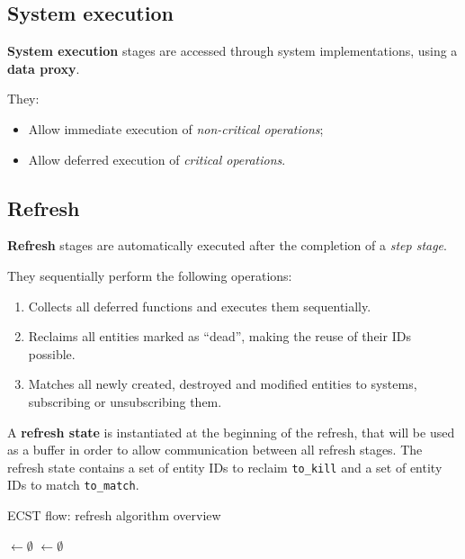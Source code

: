 \documentclass[oneside, 12pt, a4paper, openany]{book}
\begin{document}
\subsection{System execution}\label{system-execution}

\textbf{System execution} stages are accessed through system
implementations, using a \textbf{data proxy}.

They:

\begin{itemize}
\item
  Allow immediate execution of \emph{non-critical operations};
\item
  Allow deferred execution of \emph{critical operations}.
\end{itemize}

\hypertarget{flow_refresh}{\subsection{Refresh}\label{flow_refresh}}

\textbf{Refresh} stages are automatically executed after the completion
of a \emph{step stage}.

They sequentially perform the following operations:

\begin{enumerate}
\def\labelenumi{\arabic{enumi}.}
\item
  Collects all deferred functions and executes them sequentially.
\item
  Reclaims all entities marked as ``dead'', making the reuse of their
  IDs possible.
\item
  Matches all newly created, destroyed and modified entities to systems,
  subscribing or unsubscribing them.
\end{enumerate}

A \textbf{refresh state} is instantiated at the beginning of the
refresh, that will be used as a buffer in order to allow communication
between all refresh stages. The refresh state contains a set of entity
IDs to reclaim
\texttt{to_kill}
and a set of entity IDs to match
\texttt{to_match}.

\begin{algorithm}[H]
\caption{ECST flow: refresh algorithm overview}
\footnotesize


    \ToKill $\longleftarrow \emptyset$\;
    \ToMatch $\longleftarrow \emptyset$\;
    \BlankLine
    \ExecuteDeferredFunctions{\ToKill, \ToMatch} 
    \ReclaimDeadEntities{\ToKill} 
    \MatchEntitiesToSystems{\ToMatch} 

\end{algorithm}
\end{document}
